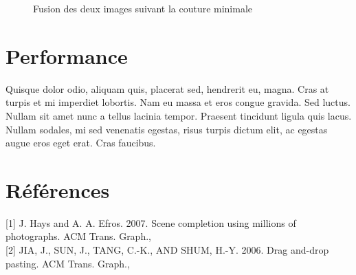 \documentclass[a4paper]{article}
\begin{document}
\begin{figure}[!ht]%
    \centering
    \hspace{0.030\textwidth}
    \caption{Fusion des deux images suivant la couture minimale}
    \label{results}
\end{figure}

\section{Performance}

Quisque dolor odio, aliquam quis, placerat sed, hendrerit eu, magna. Cras at
turpis et mi imperdiet lobortis. Nam eu massa et eros congue gravida. Sed
luctus. Nullam sit amet nunc a tellus lacinia tempor. Praesent tincidunt ligula
quis lacus. Nullam sodales, mi sed venenatis egestas, risus turpis dictum elit,
ac egestas augue eros eget erat. Cras faucibus.

\section{Références}

[1] J. Hays and A. A. Efros.  2007. Scene completion using millions of photographs. ACM Trans. Graph.,
\\

[2] JIA, J., SUN, J., TANG, C.-K., AND SHUM, H.-Y. 2006. Drag and-drop pasting. ACM Trans. Graph.,
\end{document}

